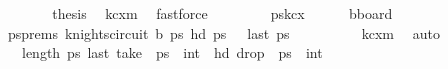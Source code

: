 \begin{isabellebody}
\ \ \ \ \isamarkupfalse%
\ \isamarkupfalse%
\ {\isacharquery}{\kern0pt}thesis\ \isamarkupfalse%
\ kc{\isacharunderscore}{\kern0pt}{}xm\ \isamarkupfalse%
\ fastforce\isanewline
\ \ \isamarkupfalse%
\isanewline
\ \ \ \ \isamarkupfalse%
\ {\isacharquery}{\kern0pt}pskc{}x{}{\isachardoublequoteclose}\isanewline
\ \ \ \ \isamarkupfalse%
\ {\isacharquery}{\kern0pt}bboard\ {}\ {}{\isachardoublequoteclose}\isanewline
\ \ \ \ \isamarkupfalse%
\ psprems{\isacharcolon}{\kern0pt}\ {\isachardoublequoteopen}knights{\isacharunderscore}{\kern0pt}circuit\ {\isacharquery}{\kern0pt}b\ {\isacharquery}{\kern0pt}ps\ {\isachardoublequoteopen}hd\ {\isacharquery}{\kern0pt}ps\ {\isacharequal}{\kern0pt}\ {\isacharparenleft}{\kern0pt}{}{\isacharcomma}{\kern0pt}{}{\isacharparenright}{\kern0pt}{\isachardoublequoteclose}\ {\isachardoublequoteopen}last\ {\isacharquery}{\kern0pt}ps\ {\isacharequal}{\kern0pt}\ {\isacharparenleft}{\kern0pt}{}{\isacharcomma}{\kern0pt}{}{\isacharparenright}{\kern0pt}{\isachardoublequoteclose}\isanewline
\ \ \ \ \ \ \isamarkupfalse%
\ kc{\isacharunderscore}{\kern0pt}{}xm\ \isamarkupfalse%
\ auto\isanewline
\ \ \ \ \isamarkupfalse%
\ {\isachardoublequoteopen}{}{}\ {\isacharless}{\kern0pt}\ length\ {\isacharquery}{\kern0pt}ps\ {\isachardoublequoteopen}last\ {\isacharparenleft}{\kern0pt}take\ {}{}\ {\isacharquery}{\kern0pt}ps\ {\isacharequal}{\kern0pt}\ {\isacharparenleft}{\kern0pt}{}{\isacharcomma}{\kern0pt}int\ {}{\isacharminus}{\kern0pt}{}{\isacharparenright}{\kern0pt}{\isachardoublequoteclose}\ {\isachardoublequoteopen}hd\ {\isacharparenleft}{\kern0pt}drop\ {}{}\ {\isacharquery}{\kern0pt}ps\ {\isacharequal}{\kern0pt}\ {\isacharparenleft}{\kern0pt}{}{\isacharcomma}{\kern0pt}int\ {}{\isacharparenright}{\kern0pt}{\isachardoublequoteclose}\ \isanewline

\end{isabellebody}
